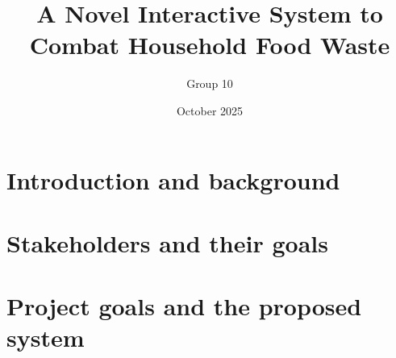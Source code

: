 \documentclass[manuscript]{acmart}
\title{A Novel Interactive System to Combat Household Food Waste}
\author{Group 10}
\date{October 2025}
\begin{document}
\maketitle

\tableofcontents
\newpage


\newpage
\section{Introduction and background}

\label{sec:introduction}


\newpage
\section{Stakeholders and their goals}

\label{sec:stakeholders}



\newpage 
\section{Project goals and the proposed system}

\label{sec:project-goals}
\end{document}
